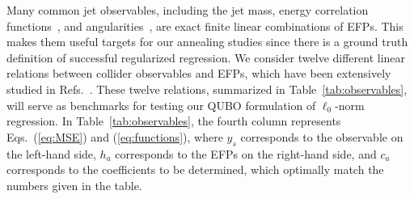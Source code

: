 \documentclass[aps,prd,twocolumn, superscriptaddress,preprintnumbers, nofootinbib,longbibliography,floatfix]{revtex4-2}
\DeclareRobustCommand{\Tab}[1]{Table~\ref{#1}}
\DeclareRobustCommand{\Eqs}[2]{Eqs.~(\ref{#1}) and (\ref{#2})}
\DeclareRobustCommand{\Refs}[1]{Refs.~\cite{#1}}
\begin{document}
{\begin{table*}
\caption{Labels and names of the twelve observable relations used in our EFP case study.
%
The third column indicates possible restrictions on their range of applicability, where $M$ is the number of particles in the jet and $n$ is the number of spatial dimensions.
%
The fourth column gives the corresponding multigraph representations of the linear EFP relations and represents \Eqs{eq:MSE}{eq:functions}, where $y_s$ corresponds to the observable on the left-hand side, $h_a$ corresponds to the EFPs on the right-hand side, and $c_a$ corresponds to the coefficients to be determined.
%
}
\label{tab:observables}
\end{table*}
}


Many common jet observables, including the jet mass, energy correlation functions~\cite{Larkoski:2013eya}, and angularities~\cite{Ellis:2010rwa,Larkoski:2014pca}, are exact finite linear combinations of EFPs.
%
This makes them useful targets for our annealing studies since there is a ground truth definition of successful regularized regression.
%
We consider twelve different linear relations between collider observables and EFPs, which have been extensively studied in \Refs{Komiske:2017aww,Komiske:2019asc}.
%
These twelve relations, summarized in \Tab{tab:observables}, will serve as benchmarks for testing our QUBO formulation of $\ell_0$-norm regression. In \Tab{tab:observables}, the fourth column represents \Eqs{eq:MSE}{eq:functions}, where $y_s$ corresponds to the observable on the left-hand side, $h_a$ corresponds to the EFPs on the right-hand side, and $c_a$ corresponds to the coefficients to be determined, which optimally match the numbers given in the table.
\end{document}
